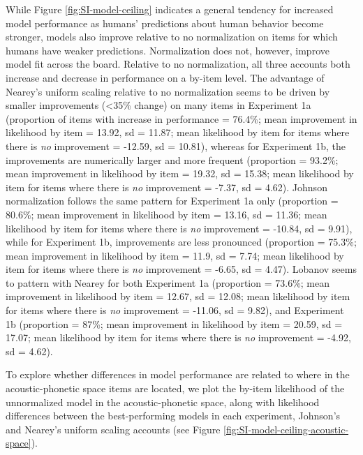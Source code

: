 \documentclass[preprint]{JASA}
\begin{document}
While Figure \ref{fig:SI-model-ceiling} indicates a general tendency for increased model performance as humans' predictions about human behavior become stronger, models also improve relative to no normalization on items for which humans have weaker predictions. Normalization does not, however, improve model fit across the board. Relative to no normalization, all three accounts both increase and decrease in performance on a by-item level. The advantage of Nearey's uniform scaling relative to no normalization seems to be driven by smaller improvements (\textless35\% change) on many items in Experiment 1a (proportion of items with increase in performance = 76.4\%; mean improvement in likelihood by item = 13.92, sd = 11.87; mean likelihood by item for items where there is \emph{no} improvement = -12.59, sd = 10.81), whereas for Experiment 1b, the improvements are numerically larger and more frequent (proportion = 93.2\%; mean improvement in likelihood by item = 19.32, sd = 15.38; mean likelihood by item for items where there is \emph{no} improvement = -7.37, sd = 4.62). Johnson normalization follows the same pattern for Experiment 1a only (proportion = 80.6\%; mean improvement in likelihood by item = 13.16, sd = 11.36; mean likelihood by item for items where there is \emph{no} improvement = -10.84, sd = 9.91), while for Experiment 1b, improvements are less pronounced (proportion = 75.3\%; mean improvement in likelihood by item = 11.9, sd = 7.74; mean likelihood by item for items where there is \emph{no} improvement = -6.65, sd = 4.47). Lobanov seems to pattern with Nearey for both Experiment 1a (proportion = 73.6\%; mean improvement in likelihood by item = 12.67, sd = 12.08; mean likelihood by item for items where there is \emph{no} improvement = -11.06, sd = 9.82), and Experiment 1b (proportion = 87\%; mean improvement in likelihood by item = 20.59, sd = 17.07; mean likelihood by item for items where there is \emph{no} improvement = -4.92, sd = 4.62).

To explore whether differences in model performance are related to where in the acoustic-phonetic space items are located, we plot the by-item likelihood of the unnormalized model in the acoustic-phonetic space, along with likelihood differences between the best-performing models in each experiment, Johnson's and Nearey's uniform scaling accounts (see Figure \ref{fig:SI-model-ceiling-acoustic-space}).
\end{document}
